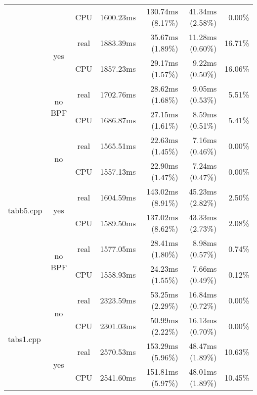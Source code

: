 \documentclass[en]{pracamgr}
\begin{document}
\begin{small}
\begin{longtable}{|l|c|c|r|r|r|r|}
                            &                         & CPU  & 1600.23ms & 130.74ms (8.17\%) & 41.34ms (2.58\%) & 0.00\% \\*
                            \cline{2-7}
                            & \multirow{2}{*}{yes}    & real & 1883.39ms & 35.67ms (1.89\%) & 11.28ms (0.60\%) & 16.71\% \\*
                            &                         & CPU  & 1857.23ms & 29.17ms (1.57\%) & 9.22ms (0.50\%) & 16.06\% \\*
                            \cline{2-7}
                            & \multirow{2}{*}{no BPF} & real & 1702.76ms & 28.62ms (1.68\%) & 9.05ms (0.53\%) & 5.51\% \\*
                            &                         & CPU  & 1686.87ms & 27.15ms (1.61\%) & 8.59ms (0.51\%) & 5.41\% \\
\hline
\multirow{6}{*}{tabb5.cpp}  & \multirow{2}{*}{no}     & real & 1565.51ms & 22.63ms (1.45\%) & 7.16ms (0.46\%) & 0.00\% \\*
                            &                         & CPU  & 1557.13ms & 22.90ms (1.47\%) & 7.24ms (0.47\%) & 0.00\% \\*
                            \cline{2-7}
                            & \multirow{2}{*}{yes}    & real & 1604.59ms & 143.02ms (8.91\%) & 45.23ms (2.82\%) & 2.50\% \\*
                            &                         & CPU  & 1589.50ms & 137.02ms (8.62\%) & 43.33ms (2.73\%) & 2.08\% \\*
                            \cline{2-7}
                            & \multirow{2}{*}{no BPF} & real & 1577.05ms & 28.41ms (1.80\%) & 8.98ms (0.57\%) & 0.74\% \\*
                            &                         & CPU  & 1558.93ms & 24.23ms (1.55\%) & 7.66ms (0.49\%) & 0.12\% \\
\hline
\multirow{6}{*}{tabs1.cpp}  & \multirow{2}{*}{no}     & real & 2323.59ms & 53.25ms (2.29\%) & 16.84ms (0.72\%) & 0.00\% \\*
                            &                         & CPU  & 2301.03ms & 50.99ms (2.22\%) & 16.13ms (0.70\%) & 0.00\% \\*
                            \cline{2-7}
                            & \multirow{2}{*}{yes}    & real & 2570.53ms & 153.29ms (5.96\%) & 48.47ms (1.89\%) & 10.63\% \\*
                            &                         & CPU  & 2541.60ms & 151.81ms (5.97\%) & 48.01ms (1.89\%) & 10.45\% \\*

\end{longtable}
\end{small}
\end{document}
